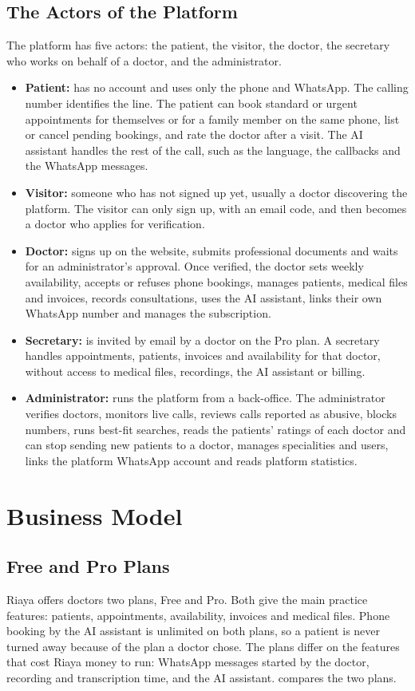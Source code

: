 \subsection{The Actors of the Platform}
The platform has five actors: the patient, the visitor, the doctor, the secretary who works on behalf of a doctor, and the administrator.
\begin{itemize}
    \item \textbf{Patient:} has no account and uses only the phone and WhatsApp. The calling number identifies the line. The patient can book standard or urgent appointments for themselves or for a family member on the same phone, list or cancel pending bookings, and rate the doctor after a visit. The AI assistant handles the rest of the call, such as the language, the callbacks and the WhatsApp messages.
    \item \textbf{Visitor:} someone who has not signed up yet, usually a doctor discovering the platform. The visitor can only sign up, with an email code, and then becomes a doctor who applies for verification.
    \item \textbf{Doctor:} signs up on the website, submits professional documents and waits for an administrator's approval. Once verified, the doctor sets weekly availability, accepts or refuses phone bookings, manages patients, medical files and invoices, records consultations, uses the AI assistant, links their own WhatsApp number and manages the subscription.
    \item \textbf{Secretary:} is invited by email by a doctor on the Pro plan. A secretary handles appointments, patients, invoices and availability for that doctor, without access to medical files, recordings, the AI assistant or billing.
    \item \textbf{Administrator:} runs the platform from a back-office. The administrator verifies doctors, monitors live calls, reviews calls reported as abusive, blocks numbers, runs best-fit searches, reads the patients' ratings of each doctor and can stop sending new patients to a doctor, manages specialities and users, links the platform WhatsApp account and reads platform statistics.
\end{itemize}

\section{Business Model}

\subsection{Free and Pro Plans}
Riaya offers doctors two plans, Free and Pro. Both give the main practice features: patients, appointments, availability, invoices and medical files. Phone booking by the AI assistant is unlimited on both plans, so a patient is never turned away because of the plan a doctor chose. The plans differ on the features that cost Riaya money to run: WhatsApp messages started by the doctor, recording and transcription time, and the AI assistant.  compares the two plans.

